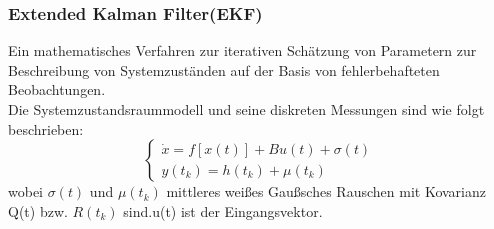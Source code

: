 \documentclass[serif,11pt, xcolor=table]{beamer}
\begin{document}
\begin{frame}
	\frametitle{Extended Kalman Filter(EKF)}
	 
	\small{ Ein mathematisches Verfahren zur iterativen Schätzung von Parametern zur Beschreibung von Systemzuständen auf der Basis von fehlerbehafteten Beobachtungen.}\\ 
	\vskip 0.2cm
	Die Systemzustandsraummodell und seine diskreten Messungen sind wie folgt beschrieben:
	$$\left\{\begin{array}{l}
		\Dot{x}=f[x(t)]+Bu(t)+\sigma(t) 
		\\y(t_{k})=h(t_{k})+\mu(t_{k})
	\end{array}\right.$$
	wobei $\sigma(t)$ und $\mu(t_{k})$ mittleres weißes Gaußsches Rauschen mit Kovarianz Q(t) bzw. $R(t_{k})$   sind.u(t) ist der Eingangsvektor.
\end{frame}
\end{document}
